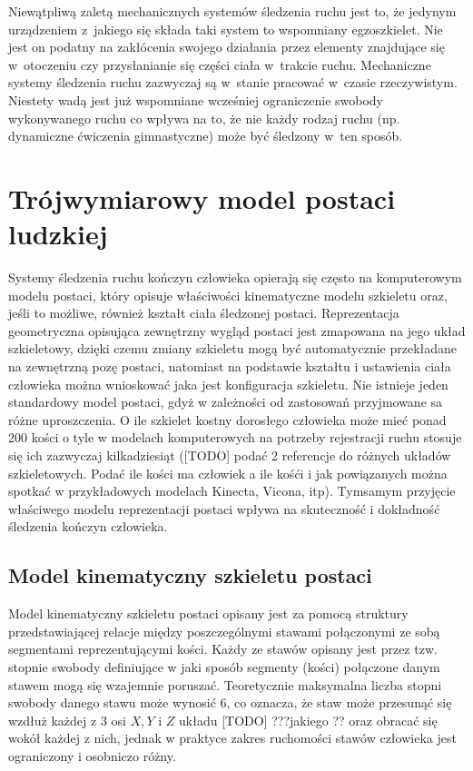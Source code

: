 Niewątpliwą zaletą mechanicznych systemów śledzenia ruchu jest to, że jedynym urządzeniem z~jakiego się składa taki system to wspomniany egzoszkielet. Nie jest on podatny na zakłócenia swojego działania przez elementy znajdujące się w~otoczeniu czy przysłanianie się części ciała w~trakcie ruchu. Mechaniczne systemy śledzenia ruchu zazwyczaj są w~stanie pracować w~czasie rzeczywistym. Niestety wadą jest już wspomniane wcześniej ograniczenie swobody wykonywanego ruchu co wpływa na to, że nie każdy rodzaj ruchu (np. dynamiczne ćwiczenia gimnastyczne) może być śledzony w~ten sposób.

\section{Trójwymiarowy model postaci ludzkiej} \label{chap:bodyRep}
Systemy śledzenia ruchu kończyn człowieka opierają się często na komputerowym modelu postaci, który opisuje właściwości kinematyczne modelu szkieletu oraz, jeśli to możliwe, również kształt ciała śledzonej postaci. Reprezentacja geometryczna opisująca zewnętrzny wygląd postaci jest zmapowana na jego układ szkieletowy, dzięki czemu zmiany szkieletu mogą być automatycznie przekładane na zewnętrzną pozę postaci, natomiast na podstawie kształtu i ustawienia ciała człowieka można wnioskować jaka jest konfiguracja szkieletu. 
Nie istnieje jeden standardowy model postaci, gdyż w zależności od zastosowań przyjmowane sa różne uproszczenia. O ile szkielet kostny dorosłego człowieka może mieć ponad 200 kości o tyle w modelach komputerowych na potrzeby rejestracji ruchu stosuje się ich zazwyczaj kilkadziesiąt ([TODO] podać 2 referencje do różnych układów szkieletowych. Podać ile kości ma człowiek a ile kośći i jak powiązanych można spotkać w przykładowych modelach Kinecta, Vicona, itp). Tymsamym przyjęcie właściwego modelu reprezentacji postaci wpływa na skuteczność i dokładność śledzenia kończyn człowieka.

\subsection{Model kinematyczny szkieletu postaci}
Model kinematyczny szkieletu postaci opisany jest za pomocą struktury przedstawiającej relacje między poszczególnymi stawami połączonymi ze sobą segmentami reprezentującymi kości. Każdy ze stawów opisany jest przez tzw. stopnie swobody definiujące w jaki sposób segmenty (kości) połączone danym stawem mogą się wzajemnie poruszać. Teoretycznie maksymalna liczba stopni swobody danego stawu może wynosić 6, co oznacza, że staw może przesunąć się wzdłuż każdej z 3 osi $X, Y$ i $Z$ układu [TODO] ???jakiego ?? oraz obracać się wokół każdej z nich, jednak w praktyce zakres ruchomości stawów człowieka jest ograniczony i osobniczo różny.\\

